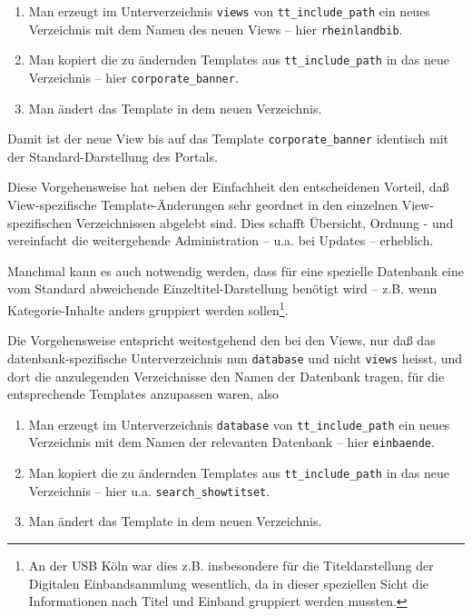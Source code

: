 \documentclass[11pt, twoside, a4paper, BCOR8mm, DIV12, bibtotoc,idxtotoc]{scrbook}
\begin{document}
\begin{enumerate}
\item Man erzeugt im Unterverzeichnis \texttt{views} von
  \texttt{tt\_include\_path} ein neues Verzeichnis mit dem Namen des neuen
  Views -- hier \texttt{rheinlandbib}.
\item Man kopiert die zu ändernden Templates aus
  \texttt{tt\_include\_path} in das neue Verzeichnis -- hier \texttt{corporate\_banner}.
\item Man ändert das Template in dem neuen Verzeichnis.
\end{enumerate}

Damit ist der neue View bis auf das Template
\texttt{corporate\_banner} identisch mit der Standard-Darstellung des
Portals.

Diese Vorgehensweise hat neben der Einfachheit den entscheidenen
Vorteil, daß View-spezifische Template-Änderungen sehr geordnet in den
einzelnen View-spezifischen Verzeichnissen abgelebt sind. Dies schafft
Übersicht, Ordnung - und vereinfacht die weitergehende Administration
-- u.a. bei Updates -- erheblich.

Manchmal kann es auch notwendig werden, dass für eine spezielle
Datenbank eine vom Standard abweichende Einzeltitel-Darstellung
benötigt wird -- z.B. wenn Kategorie-Inhalte anders gruppiert werden
sollen\footnote{An der USB Köln war dies z.B. insbesondere für die
  Titeldarstellung der Digitalen Einbandsammlung wesentlich, da in
  dieser speziellen Sicht die Informationen nach Titel und Einband
  gruppiert werden mussten.}.

Die Vorgehensweise entspricht weitestgehend den bei den Views, nur daß
das datenbank-spezifische Unterverzeichnis nun \texttt{database} und
nicht \texttt{views} heisst, und dort die anzulegenden Verzeichnisse
den Namen der Datenbank tragen, für die entsprechende Templates
anzupassen waren, also

\begin{enumerate}
\item Man erzeugt im Unterverzeichnis \texttt{database} von
  \texttt{tt\_include\_path} ein neues Verzeichnis mit dem Namen der
  relevanten Datenbank -- hier \texttt{einbaende}.
\item Man kopiert die zu ändernden Templates aus
  \texttt{tt\_include\_path} in das neue Verzeichnis -- hier u.a. \texttt{search\_showtitset}.
\item Man ändert das Template in dem neuen Verzeichnis.
\end{enumerate}
\end{document}
